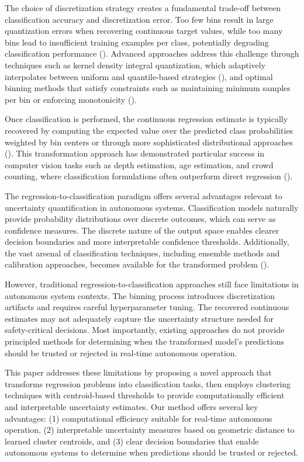 The choice of discretization strategy creates a fundamental trade-off between classification accuracy and discretization error. Too few bins result in large quantization errors when recovering continuous target values, while too many bins lead to insufficient training examples per class, potentially degrading classification performance (\cite{berg2020deep}). Advanced approaches address this challenge through techniques such as kernel density integral quantization, which adaptively interpolates between uniform and quantile-based strategies (\cite{mccarter2024unmasking}), and optimal binning methods that satisfy constraints such as maintaining minimum samples per bin or enforcing monotonicity (\cite{huang2022mbct}).

Once classification is performed, the continuous regression estimate is typically recovered by computing the expected value over the predicted class probabilities weighted by bin centers or through more sophisticated distributional approaches (\cite{barkov2024efficient, keren2018calibrated}). This transformation approach has demonstrated particular success in computer vision tasks such as depth estimation, age estimation, and crowd counting, where classification formulations often outperform direct regression (\cite{fu2018deep, xiong2023deep}).

The regression-to-classification paradigm offers several advantages relevant to uncertainty quantification in autonomous systems. Classification models naturally provide probability distributions over discrete outcomes, which can serve as confidence measures. The discrete nature of the output space enables clearer decision boundaries and more interpretable confidence thresholds. Additionally, the vast arsenal of classification techniques, including ensemble methods and calibration approaches, becomes available for the transformed problem (\cite{guha2024conformal, pintea2023step}).

However, traditional regression-to-classification approaches still face limitations in autonomous system contexts. The binning process introduces discretization artifacts and requires careful hyperparameter tuning. The recovered continuous estimates may not adequately capture the uncertainty structure needed for safety-critical decisions. Most importantly, existing approaches do not provide principled methods for determining when the transformed model's predictions should be trusted or rejected in real-time autonomous operation.

This paper addresses these limitations by proposing a novel approach that transforms regression problems into classification tasks, then employs clustering techniques with centroid-based thresholds to provide computationally efficient and interpretable uncertainty estimates. Our method offers several key advantages: (1) computational efficiency suitable for real-time autonomous operation, (2) interpretable uncertainty measures based on geometric distance to learned cluster centroids, and (3) clear decision boundaries that enable autonomous systems to determine when predictions should be trusted or rejected.

